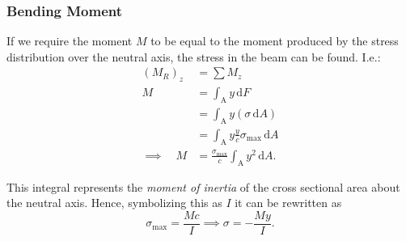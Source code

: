 \subsubsection{Bending Moment}
If we require the moment $M$ to be equal to the moment produced by the stress distribution over the neutral axis, the stress in the beam can be found.
I.e.:
\begin{align*}
  \left( M_R \right)_z &= \sum M_z \\
  M &= \int_{\mathrm{A}} y \, \mathrm{d}F \\
    &= \int_{\mathrm{A}} y \left( \sigma \, \mathrm{d}A \right) \\
    &= \int_{\mathrm{A}} y \frac{y}{c}\sigma_{\mathrm{max}} \, \mathrm{d}A \\
\implies \quad M &= \frac{\sigma_{\mathrm{max}}}{c} \int_{\mathrm{A}} y^2 \, \mathrm{d}A
.\end{align*}

This integral represents the \textit{moment of inertia} of the cross sectional area about the neutral axis.
Hence, symbolizing this as $I$ it can be rewritten as
\[ 
\sigma_{\mathrm{max}} = \frac{Mc}{I} \implies \sigma = - \frac{My}{I}
.\]

